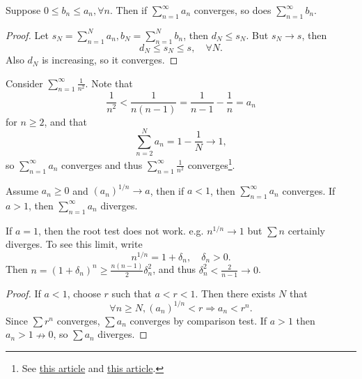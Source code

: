 \begin{theorem}\label{thm:Comparison test}
    Suppose $ 0\le b_n\le a_n, \forall n $. Then if $ \sum_{n=1}^{\infty} a_n $ converges, so does $\sum_{n=1}^{\infty} b_n$.
\end{theorem}
\begin{proof}
    Let $ s_N=\sum_{n=1}^{N}a_n, b_N=\sum_{n=1}^{N}b_n $, then $ d_N\le s_N $. But $s_N\to s$, then 
    \[
        d_N\le s_N\le s, \quad\forall N.
    \]
    Also $ d_N $ is increasing, so it converges.
\end{proof}

\begin{example}
    Consider $ \sum_{n=1}^{\infty}\frac{1}{n^2} $. Note that 
    \[
        \frac{1}{n^2}<\frac{1}{n(n-1)} = \frac{1}{n-1}-\frac{1}{n} = a_n
    \]
    for $n\ge 2$, and that
    \[
        \sum_{n=2}^{N} a_n = 1-\frac{1}{N}\to 1,
    \]
    so $ \sum_{n=1}^{\infty}a_n $ converges and thus $ \sum_{n=1}^{\infty}\frac{1}{n^2} $ converges\footnote{See \href{https://www.cnblogs.com/misaka01034/p/BaselProof.html}{this article} and \href{https://www.math.cmu.edu/~bwsulliv/basel-problem.pdf}{this article}.}.
\end{example}

\begin{theorem}\label{thm:Root test}
    Assume $a_n\ge 0$ and $ (a_n)^{1/n}\to a $, then if $a<1$, then $ \sum_{n=1}^{\infty}a_n$ converges. If $ a>1 $, then $\sum_{n=1}^{\infty}a_n$ diverges.
\end{theorem}
\begin{remark}
    If $a=1$, then the root test does not work. e.g. $ n^{1/n}\to 1 $ but $\sum n$ certainly diverges. To see this limit, write
    \[
        n^{1/n} = 1+\delta_n, \quad \delta_n>0.
    \]
    Then $ n = (1+\delta_n)^n\ge \frac{n(n-1)}{2}\delta_n^2 $, and thus $ \delta_n^2<\frac{2}{n-1}\to 0 $.
\end{remark}
\begin{proof}
    If $ a<1 $, choose $r$ such that $a<r<1$. Then there exists $N$ that 
    \[
        \forall n\ge N, (a_n)^{1/n}<r \Longrightarrow a_n<r^n.
    \]
    Since $ \sum r^n $ converges, $\sum a_n$ converges by comparison test. If $a>1$ then $a_n>1\nrightarrow 0$, so $\sum a_n$ diverges.
\end{proof}

